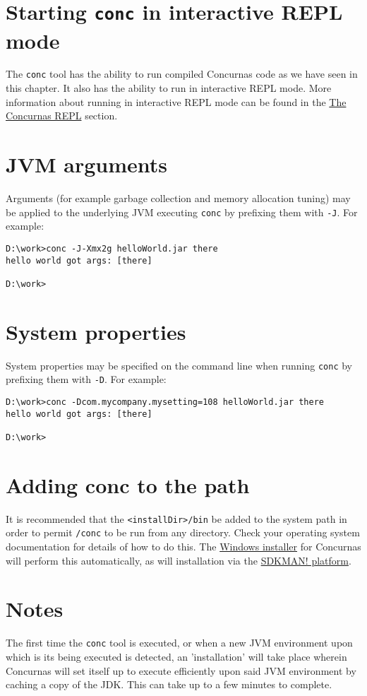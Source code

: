 \documentclass[conc-doc]{subfiles}
\begin{document}
\section{Starting \lstinline[language=None]!conc! in interactive REPL mode}
The \lstinline[language=None]{conc} tool has the ability to run compiled Concurnas code as we have seen in this chapter. It also has the ability to run in interactive REPL mode. More information about running in interactive REPL mode can be found in the \hyperref[ch:repl]{The Concurnas REPL} section.

\section{JVM arguments}
Arguments (for example garbage collection and memory allocation tuning) may be applied to the underlying JVM executing \lstinline[language=None]{conc} by prefixing them with \lstinline[language=None]{-J}. For example:

\begin{lstlisting}[language=None]
D:\work>conc -J-Xmx2g helloWorld.jar there
hello world got args: [there]

D:\work>
\end{lstlisting}

\section{System properties}
System properties may be specified on the command line when running \lstinline[language=None]{conc} by prefixing them with \lstinline[language=None]{-D}. For example:

\begin{lstlisting}[language=None]
D:\work>conc -Dcom.mycompany.mysetting=108 helloWorld.jar there
hello world got args: [there]

D:\work>
\end{lstlisting}

\section{Adding conc to the path}
It is recommended that the \lstinline[language=None]{<installDir>/bin} be added to the system path in order to permit \lstinline[language=None]{/conc} to be run from any directory. Check your operating system documentation for details of how to do this. The \href{https://concurnas.com/download.html}{Windows installer} for Concurnas will perform this automatically, as will installation via the \href{https://sdkman.io/sdks#concurnas}{SDKMAN! platform}.

\section{Notes}
The first time the \lstinline[language=None]{conc} tool is executed, or when a new JVM environment upon which is its being executed is detected, an 'installation' will take place wherein Concurnas will set itself up to execute efficiently upon said JVM environment by caching a copy of the JDK. This can take up to a few minutes to complete.
\end{document}
